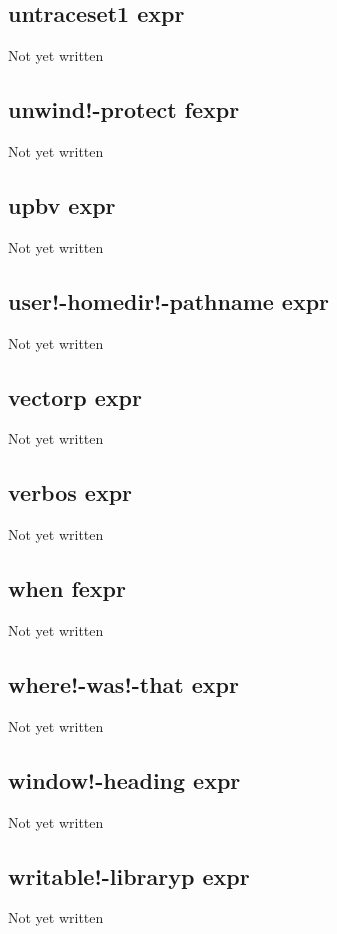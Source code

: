 \documentclass[a4paper,11pt]{article}
\begin{document}
{\subsection{\ttfamily untraceset1 expr}
   Not yet written

\subsection{\ttfamily unwind!-protect fexpr}
   Not yet written

\subsection{\ttfamily upbv expr}
   Not yet written

\subsection{\ttfamily user!-homedir!-pathname expr}
   Not yet written

\subsection{\ttfamily vectorp expr}
   Not yet written

\subsection{\ttfamily verbos expr}
   Not yet written

\subsection{\ttfamily when fexpr}
   Not yet written

\subsection{\ttfamily where!-was!-that expr}
   Not yet written

\subsection{\ttfamily window!-heading expr}
   Not yet written

\subsection{\ttfamily writable!-libraryp expr}
   Not yet written

}
\end{document}
